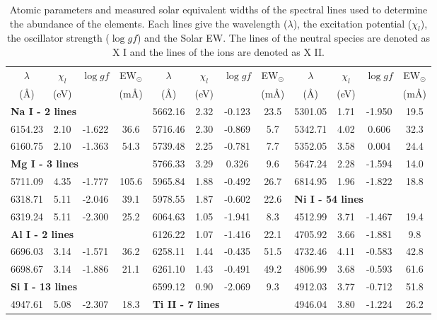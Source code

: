 \documentclass[dvips,12pt,a4paper]{report}
\begin{document}
{{\begin{table}[h!]\tiny
\centering
\caption[Atomic parameters of the spectral lines]{Atomic parameters and measured solar equivalent widths of the spectral lines used to determine the abundance of the elements. Each lines give the wavelength ($\lambda$), the excitation potential ($\chi_l$), the oscillator strength ($\log gf$) and the Solar EW. The lines of the neutral species are denoted as X I and the lines of the ions are denoted as X II.}
\label {loggf}
  \begin{tabular}{c c c c | c c c c | c c c c}
\hline
\hline
$\lambda$ & $\chi_l$ & $\log gf$ & EW$_\odot$  &$\lambda $ & $\chi_l$ & $\log gf$ & EW$_\odot$ &$\lambda $ & $\chi_l$ & $\log gf$ & EW$_\odot$ \\
(\AA) & (eV) &  & (m\AA{}) & (\AA) & (eV) &  & (m\AA{}) & (\AA) & (eV) &  & (m\AA{}) \\
\hline
\multicolumn{3}{l}{\textbf{Na I - 2 lines}} &  & 5662.16 & 2.32 & -0.123 &  23.5 & 5301.05 & 1.71 & -1.950 &  19.5 \\
6154.23 & 2.10 & -1.622 &  36.6 & 5716.46 & 2.30 & -0.869 &   5.7 & 5342.71 & 4.02 &  0.606 &  32.3 \\
6160.75 & 2.10 & -1.363 &  54.3 & 5739.48 & 2.25 & -0.781 &   7.7 & 5352.05 & 3.58 &  0.004 &  24.4 \\
\multicolumn{3}{l}{\textbf{Mg I - 3 lines}} &  & 5766.33 & 3.29 &  0.326 &   9.6 & 5647.24 & 2.28 & -1.594 &  14.0 \\
5711.09 & 4.35 & -1.777 & 105.6 & 5965.84 & 1.88 & -0.492 &  26.7 & 6814.95 & 1.96 & -1.822 &  18.8 \\
6318.71 & 5.11 & -2.046 &  39.1 & 5978.55 & 1.87 & -0.602 &  22.6 & \multicolumn{3}{l}{\textbf{Ni I - 54 lines}} &  \\
6319.24 & 5.11 & -2.300 &  25.2 & 6064.63 & 1.05 & -1.941 &   8.3 & 4512.99 & 3.71 & -1.467 &  19.4 \\
\multicolumn{3}{l}{\textbf{Al I - 2 lines}} &  & 6126.22 & 1.07 & -1.416 &  22.1 & 4705.92 & 3.66 & -1.881 &   9.8 \\
6696.03 & 3.14 & -1.571 &  36.2 & 6258.11 & 1.44 & -0.435 &  51.5 & 4732.46 & 4.11 & -0.583 &  42.8 \\
6698.67 & 3.14 & -1.886 &  21.1 & 6261.10 & 1.43 & -0.491 &  49.2 & 4806.99 & 3.68 & -0.593 &  61.6 \\
\multicolumn{3}{l}{\textbf{Si I - 13 lines}} & & 6599.12 & 0.90 & -2.069 &   9.3 & 4912.03 & 3.77 & -0.712 &  51.8 \\
4947.61 & 5.08 & -2.307 &  18.3 & \multicolumn{3}{l}{\textbf{Ti II - 7 lines}} & &  4946.04 & 3.80 & -1.224 &  26.2 \\

\end{tabular}
\end{table}}}
\end{document}
